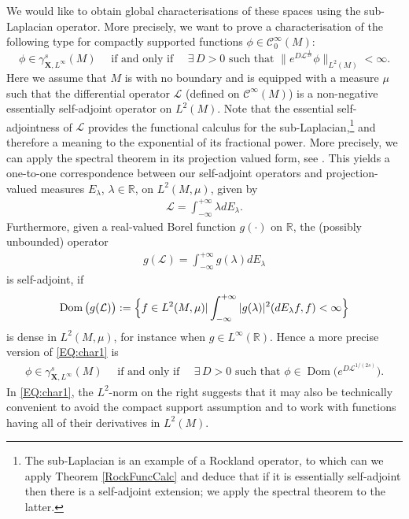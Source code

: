 \documentclass[12pt,oneside,a4paper]{book}
\numberwithin{equation}{section}     %
\theoremstyle{plain}
\theoremstyle{definition}
\DeclareMathOperator{\Dom}{Dom}
\newcommand{\R}{{\mathbb R}}
\newcommand{\slp}{{\mathcal L}}
\begin{document}
We would like to obtain global characterisations of these spaces using the sub-Laplacian operator. More precisely, we want to prove a characterisation of the following type for compactly supported functions $\phi\in\mathcal{C}_0^\infty(M)$:
\begin{equation}\label{EQ:char1}
\phi\in\gamma^s_{\mathbf{X},L^{\infty}}(M)\quad\textrm{ if and only if }\quad
\exists \,D>0\text{ such that }\|e^{D\slp^{\frac{1}{2s}}}\phi\|_{L^2(M)}<\infty.
\end{equation}
Here we assume that $M$ is with no boundary and is equipped with a measure $\mu$ such that the differential operator $\slp$ (defined on $\mathcal{C}^\infty(M)$) is a non-negative essentially self-adjoint operator on $L^2(M)$.
Note that the essential self-adjointness of $\slp$ provides the functional calculus for the sub-Laplacian,\footnote{The sub-Laplacian is an example of a Rockland operator, to which can we apply Theorem \ref{RockFuncCalc} and deduce that if it is essentially self-adjoint then there is a self-adjoint extension; we apply the spectral theorem to the latter.}
and therefore a meaning to the exponential of its fractional power. More precisely, we can apply the spectral theorem in its projection valued form, see \cite{RS1980}. This yields a one-to-one correspondence between our self-adjoint operators and projection-valued measures $E_\lambda$, $\lambda\in\R$, on $L^2(M,\mu)$, given by
\begin{align}
\slp=\int_{-\infty}^{+\infty}\lambda dE_\lambda.
\end{align}
Furthermore, given a real-valued Borel function $g(\cdot)$ on $\R$, the (possibly unbounded) operator
\begin{align}\label{EQ:FuncCalcSlp}
g(\slp)=\int_{-\infty}^{+\infty}g(\lambda) dE_\lambda
\end{align}
is self-adjoint, if 
\begin{align*}
\Dom \big(g(\slp)\big):=\Big{\{} f\in L^2(M,\mu)|\int_{-\infty}^{+\infty}|g(\lambda)|^2(dE_\lambda f,f)<\infty\Big{\}}
\end{align*}  
is dense in $L^2(M,\mu)$, for instance when $g\in L^\infty(\R)$. Hence a more precise version of \eqref{EQ:char1} is
\begin{align*}
\phi\in\gamma^s_{\mathbf{X},L^{\infty}}(M)\quad\textrm{ if and only if }\quad
\exists \,D>0\text{ such that }\phi\in\Dom\big(e^{D\slp^{1/(2s)}}\big).
\end{align*}
In \eqref{EQ:char1}, the $L^2$-norm on the right suggests that it may also be technically convenient to avoid the compact support assumption and to work with functions having all of their derivatives in $L^2(M)$. 
\end{document}
